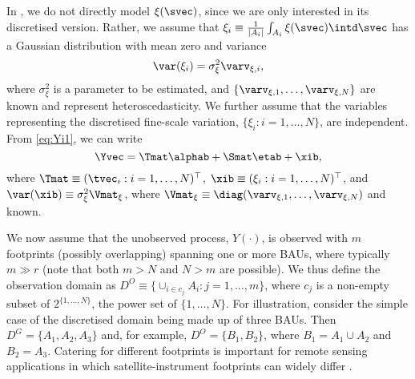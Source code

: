 In , we do not directly model $\xi(\svec)$, since we are only interested in its discretised version. Rather, we assume that $\xi_i \equiv \frac{1}{|A_i|}\int_{A_i} \xi(\svec)\intd\svec$ has a Gaussian distribution with mean zero and variance
\begin{equation*}
\var(\xi_i) = \sigma^2_\xi \varv_{\xi,i},
\end{equation*}
where $\sigma^2_\xi$ is a parameter to be estimated, and $\{\varv_{\xi,1},\dots,\varv_{\xi,N}\}$ are known and represent  heteroscedasticity. We further assume that the variables representing the discretised fine-scale variation, $\{\xi_i: i = 1,\dots,N\}$, are independent. From \eqref{eq:Yi1}, we can write
\begin{equation}\label{eq:SRE_Y}
\Yvec = \Tmat\alphab + \Smat\etab + \xib,
\end{equation}
where $\Tmat \equiv (\tvec_i: i = 1,\dots,N)^\top$, $\xib \equiv (\xi_i : i = 1,\dots,N)^\top$, and $\var(\xib) \equiv \sigma^2_\xi \Vmat_\xi$, where $\Vmat_\xi \equiv \diag(\varv_{\xi,1},\dots,\varv_{\xi,N})$ and known.

We now  assume that the unobserved process, $Y(\cdot)$, is observed with $m$ footprints (possibly overlapping) spanning one or more BAUs, where typically $m \gg r$ (note that both $m > N$ and $N >m$ are possible). We thus define the observation domain as $D^O \equiv \{ \cup_{i \in c_j} A_i : j = 1,\dots,m \}$, where $c_j$ is a non-empty subset of $2^{\{1,\dots,N\}}$, the power set of $\{1,\dots,N\}$. For illustration, consider the simple case of  the discretised domain being made up of three BAUs. Then $D^G = \{A_1,A_2,A_3\}$ and, for example, $D^O = \{B_1, B_2\}$, where $B_1 = A_1 \cup A_2$ and $B_2 = A_3$. Catering for different footprints is important for remote sensing applications in which satellite-instrument footprints can widely differ \citep[e.g.,][]{Nguyen_2012,Zammit_2015}.

